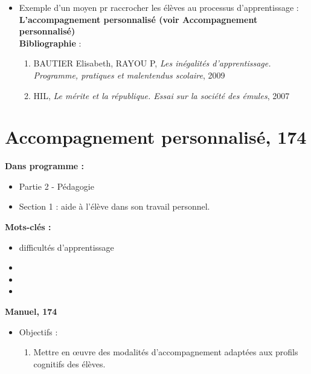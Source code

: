 \documentclass[12pt]{report}
\begin{document}
\begin{itemize}
\begin{itemize}
\begin{enumerate}
\end{enumerate}

\item Exemple d'un moyen pr raccrocher les élèves au processus d'apprentissage : \textbf{L'accompagnement personnalisé (voir Accompagnement personnalisé)} \\

\textbf{Bibliographie} : 

\begin{enumerate}
\item BAUTIER Elisabeth, RAYOU P, \textit{Les inégalités d'apprentissage. Programme, pratiques et malentendus scolaire}, 2009
\item HIL, \textit{Le mérite et la république. Essai sur la société des émules}, 2007
\end{enumerate}

\end{itemize}


\section{Accompagnement personnalisé, 174}

\textbf{Dans programme : }
\begin{itemize}
\item Partie 2 - Pédagogie
\item Section 1 : aide à l'élève dans son travail personnel. \\
\end{itemize}

\textbf{Mots-clés : } 

\begin{itemize}
\item difficultés d'apprentissage
\item 
\item 
\item  
\end{itemize}

\textbf{Manuel, 174}

\begin{itemize}
\item Objectifs : 
\begin{enumerate}
\item Mettre en œuvre des modalités d'accompagnement adaptées aux profils cognitifs des élèves. \\
\end{enumerate}


\end{itemize}
\end{itemize}
\end{document}
